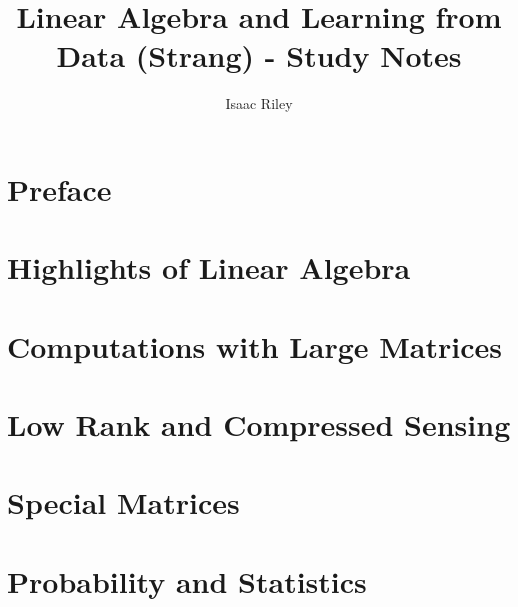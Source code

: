 \documentclass[a4paper]{article}
\title{Linear Algebra and Learning from Data (Strang) - Study Notes}
\author{Isaac Riley}
\begin{document}
\maketitle
\tableofcontents
\newpage



\setcounter{section}{-1}
\section{Preface}

\subsection{}

\subsubsection{}


\section{Highlights of Linear Algebra}

\section{Computations with Large Matrices}

\section{Low Rank and Compressed Sensing}

\section{Special Matrices}

\section{Probability and Statistics}
\end{document}
